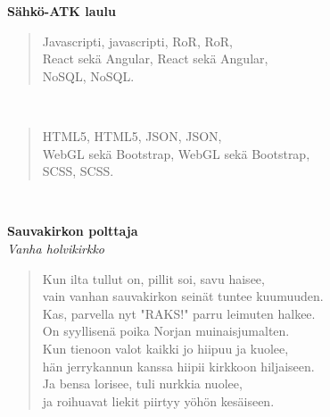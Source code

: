 %
%
\noindent\begin{minipage}{\linewidth}
\vspace{5pt}
\parbox[t]{0.85\linewidth}{\raggedright {\large\bf Sähkö-ATK laulu}\\[6pt]}
\begin{verse}
	Javascripti, javascripti, RoR, RoR,\\
	React sekä Angular, React sekä Angular,\\
	NoSQL, NoSQL.\\
\end{verse}
\end{minipage}\\[10pt]
\noindent\begin{minipage}{\linewidth}
\begin{verse}
	HTML5, HTML5, JSON, JSON,\\
	WebGL sekä Bootstrap, WebGL sekä Bootstrap,\\
	SCSS, SCSS.\\
\end{verse}
\end{minipage}\\[10pt]
%
%
\noindent\begin{minipage}{\linewidth}
\vspace{5pt}
\parbox[t]{0.85\linewidth}{\raggedright {\large\bf Sauvakirkon polttaja}\\[2pt]\small\emph{Vanha holvikirkko}\\[6pt]}
\begin{verse}
	
	Kun ilta tullut on, pillit soi, savu haisee,\\
	vain vanhan sauvakirkon seinät tuntee kuumuuden.\\
	Kas, parvella nyt "RAKS!" parru leimuten halkee.\\
	On syyllisenä poika Norjan muinaisjumalten.\\
	Kun tienoon valot kaikki jo hiipuu ja kuolee,\\
	hän jerrykannun kanssa hiipii kirkkoon hiljaiseen.\\
	Ja bensa lorisee, tuli nurkkia nuolee,\\
	ja roihuavat liekit piirtyy yöhön kesäiseen.\\
\end{verse}
\end{minipage}\\[10pt]
